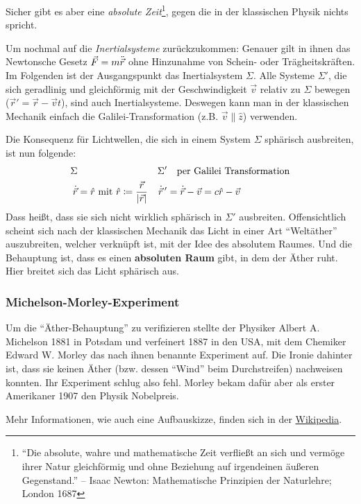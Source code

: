 Sicher gibt es aber eine \textit{absolute Zeit}\footnote{
	"`Die absolute, wahre und mathematische Zeit verfließt an sich und vermöge ihrer Natur gleichförmig und ohne Beziehung auf irgendeinen äußeren Gegenstand."'
	– Isaac Newton: Mathematische Prinzipien der Naturlehre; London 1687}, gegen die in der klassischen Physik nichts spricht.

Um nochmal auf die \textit{Inertialsysteme} zurückzukommen: Genauer gilt in ihnen das Newtonsche Gesetz $\vec{F} = m \ddot{\vec{r}}$ ohne Hinzunahme von Schein- oder Trägheitskräften. Im Folgenden ist der Ausgangspunkt das Inertialsystem $\Sigma$.
Alle Systeme $\Sigma'$, die sich geradlinig und gleichförmig mit der Geschwindigkeit $\vec v$ relativ zu $\Sigma$ bewegen ($\vec{r}' = \vec{r} - \vec{v}t$), sind auch Inertialsysteme. Deswegen kann man in der klassischen Mechanik einfach die Galilei-Transformation (z.B. $\vec{v} \parallel \hat{z}$) verwenden.

Die Konsequenz für Lichtwellen, die sich in einem System $\Sigma$ sphärisch ausbreiten, ist nun folgende:
\begin{align*}
	\Sigma& & \Sigma'& \text{~~~per Galilei Transformation}\\
  \dot{\vec{r}} &= \hat{r} \text{ mit } \hat{r} \coloneqq \frac{\vec{r}}{|\vec{r}|} & \dot{\vec{r}}\,' &= \dot{\vec{r}} - \vec{v} = c \hat{r} - \vec{v}   
\end{align*}
Dass heißt, dass sie sich nicht wirklich sphärisch in $\Sigma'$ ausbreiten. Offensichtlich scheint sich nach der klassischen Mechanik das Licht in einer Art "`Weltäther"' auszubreiten, welcher verknüpft ist, mit der Idee des absolutem Raumes. Und die Behauptung ist, dass es einen \textbf{absoluten Raum} gibt, in dem der Äther ruht. Hier breitet sich das Licht sphärisch aus.

\subsubsection{Michelson-Morley-Experiment}
Um die "`Äther-Behauptung"' zu verifizieren stellte der Physiker Albert A. Michelson 1881 in Potsdam und verfeinert 1887 in den USA, mit dem Chemiker Edward W. Morley das nach ihnen benannte Experiment auf. Die Ironie dahinter ist, dass sie keinen Äther (bzw. dessen "`Wind"' beim Durchstreifen) nachweisen konnten. Ihr Experiment schlug also fehl. Morley bekam dafür aber als erster Amerikaner 1907 den Physik Nobelpreis.

Mehr Informationen, wie auch eine Aufbauskizze, finden sich in der \href{https://de.wikipedia.org/wiki/Michelson-Morley-Experiment}{Wikipedia}.


